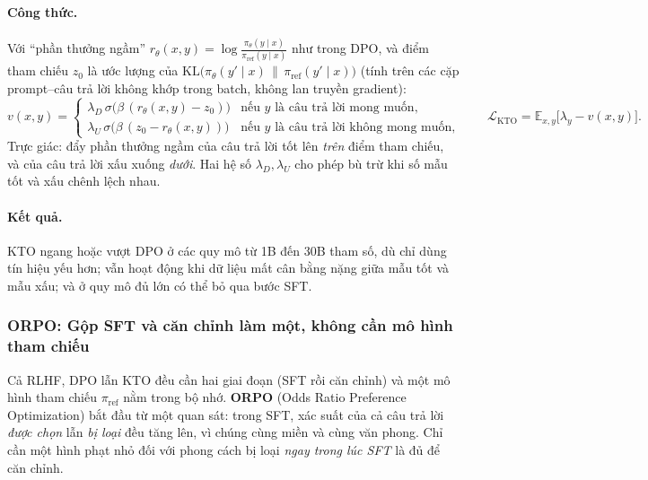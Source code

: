 \paragraph{Công thức.} Với “phần thưởng ngầm” $r_\theta(x,y) = \log\frac{\pi_\theta(y\mid x)}{\pi_{\text{ref}}(y\mid x)}$ như trong DPO, và điểm tham chiếu $z_0$ là ước lượng của $\text{KL}\big(\pi_\theta(y'\mid x)\,\|\,\pi_{\text{ref}}(y'\mid x)\big)$ (tính trên các cặp prompt--câu trả lời không khớp trong batch, không lan truyền gradient):
\[
v(x,y) = \begin{cases}
\lambda_D\, \sigma\big(\beta\,(r_\theta(x,y) - z_0)\big) & \text{nếu } y \text{ là câu trả lời mong muốn},\\
\lambda_U\, \sigma\big(\beta\,(z_0 - r_\theta(x,y))\big) & \text{nếu } y \text{ là câu trả lời không mong muốn},
\end{cases}
\qquad
\mathcal{L}_{\text{KTO}} = \mathbb{E}_{x,y}\big[\lambda_y - v(x,y)\big].
\]
Trực giác: đẩy phần thưởng ngầm của câu trả lời tốt lên \emph{trên} điểm tham chiếu, và của câu trả lời xấu xuống \emph{dưới}. Hai hệ số $\lambda_D, \lambda_U$ cho phép bù trừ khi số mẫu tốt và xấu chênh lệch nhau.

\paragraph{Kết quả.} KTO ngang hoặc vượt DPO ở các quy mô từ 1B đến 30B tham số, dù chỉ dùng tín hiệu yếu hơn; vẫn hoạt động khi dữ liệu mất cân bằng nặng giữa mẫu tốt và mẫu xấu; và ở quy mô đủ lớn có thể bỏ qua bước SFT.

\subsubsection{ORPO: Gộp SFT và căn chỉnh làm một, không cần mô hình tham chiếu \newtag}
\label{ssec:orpo}
Cả RLHF, DPO lẫn KTO đều cần hai giai đoạn (SFT rồi căn chỉnh) và một mô hình tham chiếu $\pi_{\text{ref}}$ nằm trong bộ nhớ. \textbf{ORPO} (Odds Ratio Preference Optimization) \cite{hong2024orpo} bắt đầu từ một quan sát: trong SFT, xác suất của cả câu trả lời \emph{được chọn} lẫn \emph{bị loại} đều tăng lên, vì chúng cùng miền và cùng văn phong. Chỉ cần một hình phạt nhỏ đối với phong cách bị loại \emph{ngay trong lúc SFT} là đủ để căn chỉnh.

